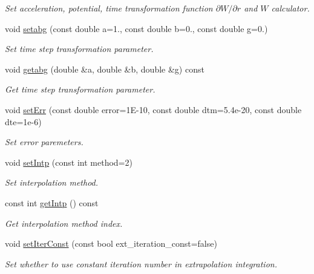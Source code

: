 \begin{DoxyCompactItemize}
\begin{DoxyCompactList}\small\item\em Set acceleration, potential, time transformation function $\partial W/\partial r$ and $W$ calculator. \end{DoxyCompactList}\item 
void \hyperlink{classARC_1_1chainpars_a37f8af288217cbfc61a3593e21976d06}{setabg} (const double a=1., const double b=0., const double g=0.)
\begin{DoxyCompactList}\small\item\em Set time step transformation parameter. \end{DoxyCompactList}\item 
void \hyperlink{classARC_1_1chainpars_ad294bf8a2f7f5a20e554d4a9cb2c3e4c}{getabg} (double \&a, double \&b, double \&g) const
\begin{DoxyCompactList}\small\item\em Get time step transformation parameter. \end{DoxyCompactList}\item 
void \hyperlink{classARC_1_1chainpars_a59709cc9464bed3a17f99cf3fd611ad3}{set\+Err} (const double error=1\+E-\/10, const double dtm=5.\+4e-\/20, const double dte=1e-\/6)
\begin{DoxyCompactList}\small\item\em Set error paremeters. \end{DoxyCompactList}\item 
void \hyperlink{classARC_1_1chainpars_ae5946e3523a7e72d38f579e900dd20e5}{set\+Intp} (const int method=2)
\begin{DoxyCompactList}\small\item\em Set interpolation method. \end{DoxyCompactList}\item 
const int \hyperlink{classARC_1_1chainpars_aad612e3c643bdd642245397d7dc57d94}{get\+Intp} () const
\begin{DoxyCompactList}\small\item\em Get interpolation method index. \end{DoxyCompactList}\item 
void \hyperlink{classARC_1_1chainpars_acee4adb70778441325e76eedbdbe6343}{set\+Iter\+Const} (const bool ext\+\_\+iteration\+\_\+const=false)
\begin{DoxyCompactList}\small\item\em Set whether to use constant iteration number in extrapolation integration. \end{DoxyCompactList}\item 

\end{DoxyCompactItemize}
